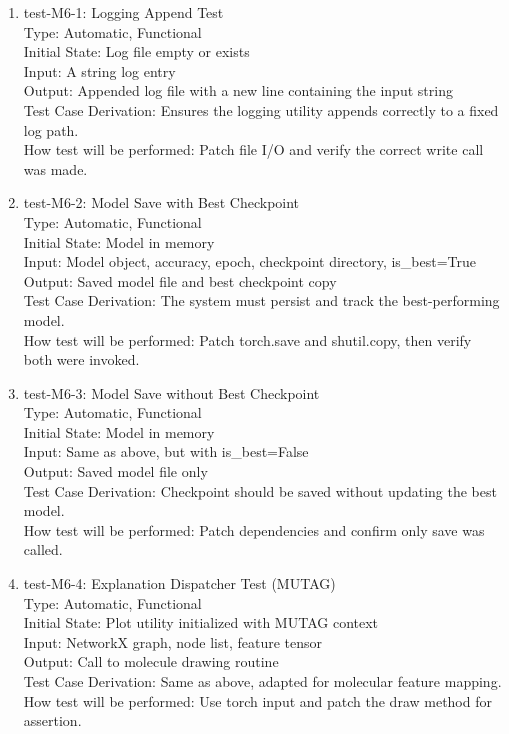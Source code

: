 \documentclass[12pt, titlepage]{article}
\begin{document}
\begin{enumerate}

\item{test-M6-1: Logging Append Test\\}
Type: Automatic, Functional \\
Initial State: Log file empty or exists \\
Input: A string log entry \\
Output: Appended log file with a new line containing the input string \\
Test Case Derivation: Ensures the logging utility appends correctly to a fixed log path. \\
How test will be performed: Patch file I/O and verify the correct write call was made.

\item{test-M6-2: Model Save with Best Checkpoint\\}
Type: Automatic, Functional \\
Initial State: Model in memory \\
Input: Model object, accuracy, epoch, checkpoint directory, is\_best=True \\
Output: Saved model file and best checkpoint copy \\
Test Case Derivation: The system must persist and track the best-performing model. \\
How test will be performed: Patch torch.save and shutil.copy, then verify both were invoked.

\item{test-M6-3: Model Save without Best Checkpoint\\}
Type: Automatic, Functional \\
Initial State: Model in memory \\
Input: Same as above, but with is\_best=False \\
Output: Saved model file only \\
Test Case Derivation: Checkpoint should be saved without updating the best model. \\
How test will be performed: Patch dependencies and confirm only save was called.

\item{test-M6-4: Explanation Dispatcher Test (MUTAG)\\}
Type: Automatic, Functional \\
Initial State: Plot utility initialized with MUTAG context \\
Input: NetworkX graph, node list, feature tensor \\
Output: Call to molecule drawing routine \\
Test Case Derivation: Same as above, adapted for molecular feature mapping. \\
How test will be performed: Use torch input and patch the draw method for assertion.


\end{enumerate}
\end{document}
